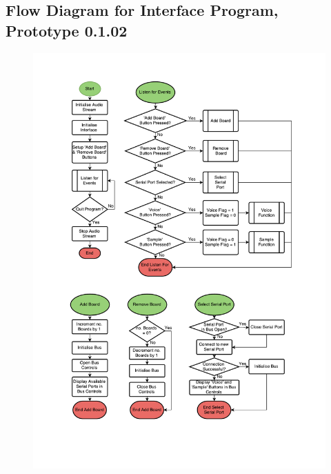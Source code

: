 \subsection{Flow Diagram for Interface Program, Prototype 0.1.02}
\label{pyblue_flow}
\begin{figure}[H]
\centering
\includegraphics[scale = 0.7]{Images/PyFlow}
\end{figure}


